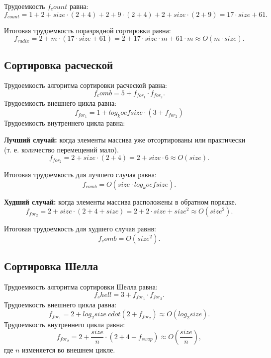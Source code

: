 Трудоемкость $f_count$ равна:
\begin{equation}
	f_{count} = 1 + 2 + size \cdot (2 + 4) + 2 + 9 \cdot(2 + 4) + 2 + size \cdot (2 + 9) = 17 \cdot size + 61.
\end{equation}

Итоговая трудоемкость поразрядной сортировки равна:
\begin{equation}
	f_{radix} = 2 + m \cdot (17 \cdot size + 61) = 2 + 17 \cdot size \cdot m + 61 \cdot m \approx O(m \cdot size).
\end{equation}

\subsection*{Сортировка расческой}
Трудоемкость алгоритма сортировки расческой равна:
\begin{equation}
	f_comb = 5 + f_{for_1} \cdot f_{for_2}.
\end{equation}
Трудоемкость внешнего цикла равна:
\begin{equation}
	f_{for_1} = 1 + log_koef{size} \cdot(3 + f_{for_2}) 
\end{equation}
Трудоемкость внутреннего цикла равна:

\textbf{Лучший случай:} когда элементы массива уже отсортированы или практически (т. е. количество перемещений мало).
\begin{equation}
	f_{for_2} = 2 + size \cdot(2 + 4) =  2 + size \cdot 6 \approx O(size).
\end{equation}

Итоговая трудоемкость для лучшего случая равна: 
\begin{equation}
	f_{comb} = O(size \cdot log_koef{size}).
\end{equation}

\textbf{Худший случай:} когда элементы массива расположены в обратном порядке.
\begin{equation}
	f_{for_2} = 2 + size \cdot(2 + 4 + size) =  2 + 2 \cdot size + size^2 \approx O(size^2).
\end{equation}

Итоговая трудоемкость для худшего случая равнв: 
\begin{equation}
	f_comb = O(size^2).
\end{equation}

\subsection*{Сортировка Шелла}
Трудоемкость алгоритма сортировки Шелла равна:
\begin{equation}
	f_shell = 3 + f_{for_1} \cdot f_{for_2}.
\end{equation}
Трудоемкость внешнего цикла равна:
\begin{equation}
	f_{for_1} = 2 + log_2{size} \ cdot (2 + f_{for_2}) \approx O(log_2{size}) .
\end{equation}
Трудоемкость внутреннего цикла равна:
\begin{equation}
	f_{for_2} = 2 + \frac{size}{n} \cdot (2 + 4 + f_{swap}) \approx O(\frac{size}{n}), 
\end{equation}
где $n$ изменяется во внешнем цикле.

